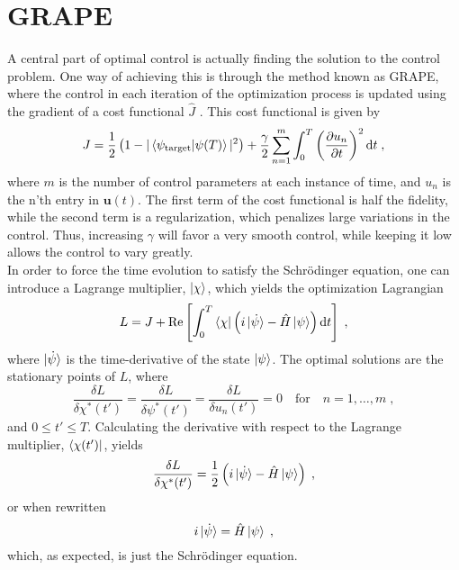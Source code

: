 \section{GRAPE}
A central part of optimal control is actually finding the solution to the control problem. One way of achieving this is through the method known as GRAPE, where the control in each iteration of the optimization process is updated using the gradient of a cost functional $\hat{J}$ \cite{QOCT}. This cost functional is given by
\begin{equation}
	J = \frac{1}{2} \left( 1-|\braket{\psi_{\mathrm{target}} | \psi (T)}|^2 \right) + \frac{\gamma}{2} \sum_{n=1}^{m} \int_{0}^{T} \left( \pdv{u_n}{t} \right)^2 \mathrm{d}t \; ,
\end{equation}
where $m$ is the number of control parameters at each instance of time, and $u_n$ is the n'th entry in $\boldsymbol{u}(t)$. The first term of the cost functional is half the fidelity, while the second term is a regularization, which penalizes large variations in the control. Thus, increasing $\gamma$ will favor a very smooth control, while keeping it low allows the control to vary greatly.\\
In order to force the time evolution to satisfy the Schrödinger equation, one can introduce a Lagrange multiplier, $\ket{\chi}$, which yields the optimization Lagrangian
\begin{equation}
	L = J + \Re \left[ \int_{0}^{T} \bra{\chi} \left( i \ket{\dot{\psi}} - \hat{H} \ket{\psi} \right) \mathrm{d}t \right] \; ,
\end{equation} 
where $\ket{\dot{\psi}}$ is the time-derivative of the state $\ket{\psi}$. The optimal solutions are the stationary points of $L$, where
\begin{equation}
	\frac{\delta L}{\delta \chi ^* (t')} = \frac{\delta L}{\delta \psi ^* (t')} = \frac{\delta L}{\delta u_n (t')} = 0 \quad \mathrm{for} \quad  n = 1, \ldots , m \; , \label{eq:statpoint}
\end{equation}
and $0 \leq t' \leq T$.
Calculating the derivative with respect to the Lagrange multiplier, $\bra{\chi (t')}$, yields
\begin{equation}
	\frac{\delta L}{\delta \chi ^* (t')} = \frac{1}{2} \left( i \ket{\dot{\psi}} -  \hat{H} \ket{\psi} \right) \; ,
\end{equation}
or when rewritten
\begin{equation}
	 i \ket{\dot{\psi}} =  \hat{H} \ket{\psi} \; ,
\end{equation}
which, as expected, is just the Schrödinger equation.
